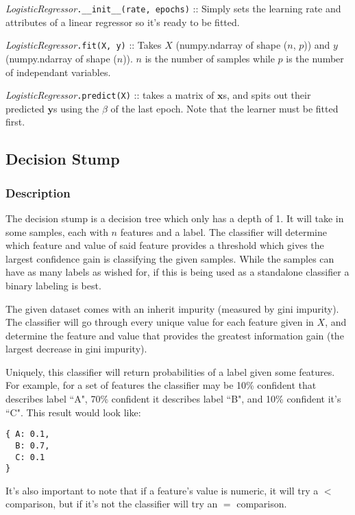 \documentclass{article}
\begin{document}
\textit{LogisticRegressor}\texttt{.\_\_init\_\_(rate, epochs)} :: Simply sets the
learning rate and attributes of a linear regressor so it's ready to be fitted.

\textit{LogisticRegressor}\texttt{.fit(X, y)} :: Takes $X$ (numpy.ndarray of shape
($n$, $p$)) and $y$ (numpy.ndarray of shape ($n$)). $n$ is the number of samples
while $p$ is the number of independant variables.

\textit{LogisticRegressor}\texttt{.predict(X)} :: takes a matrix of $\mathbf{x}$s,
and spits out their predicted $\textbf{y}$s using the $\beta$ of the last epoch.
Note that the learner must be fitted first.

\subsection{Decision Stump}

\subsubsection{Description}

The decision stump is a decision tree which only has a depth of 1.  It will take
in some samples, each with $n$ features and a label.  The classifier will
determine which feature and value of said feature provides a threshold which
gives the largest confidence gain is classifying the given samples.  While the
samples can have as many labels as wished for, if this is being used as a
standalone classifier a binary labeling is best.

The given dataset comes with an inherit impurity (measured by gini impurity).
The classifier will go through every unique value for each feature given in $X$,
and determine the feature and value that provides the greatest information gain
(the largest decrease in gini impurity).

Uniquely, this classifier will return probabilities of a label given some
features.  For example, for a set of features the classifier may be 10\%
confident that describes label ``A", 70\% confident it describes label ``B", and
10\% confident it's ``C".  This result would look like:
\begin{verbatim}
{ A: 0.1,
  B: 0.7,
  C: 0.1
}
\end{verbatim}

It's also important to note that if a feature's value is numeric, it will try a
$<$ comparison, but if it's not the classifier will try an $=$ comparison.
\end{document}
